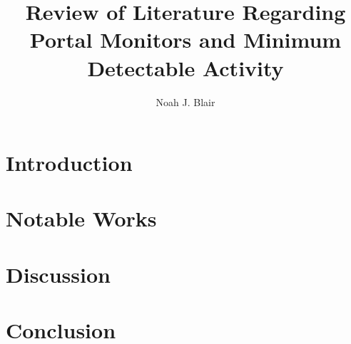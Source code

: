 \documentclass[12 pt]{paper}
\title{Review of Literature Regarding Portal Monitors and Minimum Detectable Activity}
\author{Noah J. Blair}
\begin{document}
\maketitle
\begin{abstract}
  \noindent
  
\end{abstract}
\tableofcontents
\newpage
\section{Introduction}

\section{Notable Works}

\section{Discussion}

\section{Conclusion}



{}

\csuHonorPledge
\end{document}
